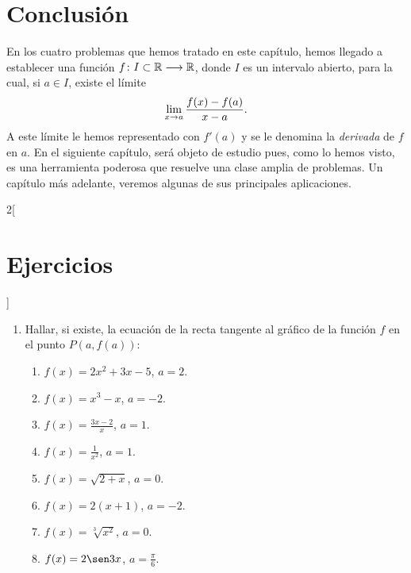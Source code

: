 \section{Conclusión}
En los cuatro problemas que hemos tratado en este capítulo, hemos llegado a establecer una función
$\funcjc{f}{I\subset\mathbb{R}}{\mathbb{R}}$, donde $I$ es un intervalo abierto, para la cual, si
$a\in I$, existe el límite
\[
\limjc{\frac{f(x) - f(a)}{x - a}}{x}{a}.
\]
A este límite le hemos representado con $f'(a)$ y se le denomina la \emph{derivada} de $f$ en $a$.
En el siguiente capítulo, será objeto de estudio pues, como lo hemos visto, es una herramienta
poderosa que resuelve una clase amplia de problemas. Un capítulo más adelante, veremos algunas de
sus principales aplicaciones.

\begin{multicols}{2}[\section{Ejercicios}]
\begingroup
\small
\begin{enumerate}[leftmargin=*]
\item Hallar, si existe, la ecuación de la recta tangente al gráfico de la función $f$ en el
    punto $P(a,f(a))$:
    \begin{enumerate}[leftmargin=*]
    \item $f(x) = 2x^2 + 3x - 5$, $a = 2$.
    \item $f(x) = x^3 - x$, $a = -2$.
    \item $\displaystyle f(x) = \frac{3x - 2}{x}$, $a = 1$.
    \item $\displaystyle f(x) = \frac{1}{x^2}$, $a = 1$.
    \item $\displaystyle f(x) = \sqrt{2 + x}$, $a = 0$.
    \item $f(x) = 2(x + 1)$, $a = -2$.
    \item $\displaystyle f(x )= \sqrt[3]{x^2}$, $a = 0$.
    \item $\displaystyle f(x) = 2\sen 3x$, $\displaystyle a = \frac{\pi}{6}$.
    \end{enumerate}


\end{enumerate}
\end{multicols}
